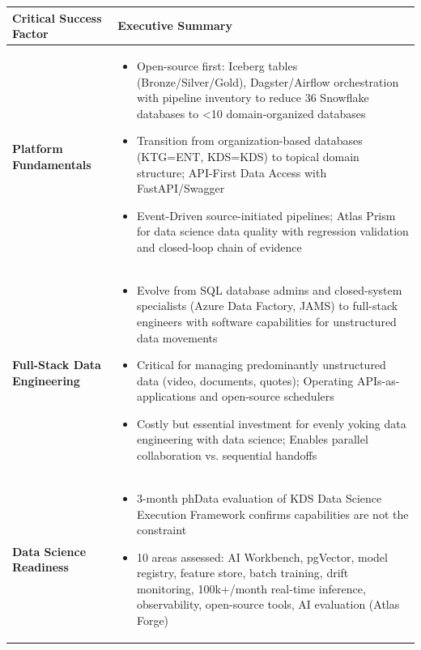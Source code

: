 \documentclass[12pt, a4paper]{article}
\begin{document}
{\small
\renewcommand{\arraystretch}{1.05}
\centering
\begin{tabularx}{\textwidth}{@{}
  >{\raggedright\arraybackslash}p{2.8cm}
  >{\raggedright\arraybackslash}p{\dimexpr\textwidth-2.8cm-2\tabcolsep-\arrayrulewidth\relax}@{}}
\toprule
\textbf{Critical Success Factor} & \textbf{Executive Summary} \\
\midrule
\textbf{Platform Fundamentals} &
\vspace{-0.5\baselineskip}
\begin{itemize}[leftmargin=*, nosep, topsep=0pt, partopsep=0pt]
  \item Open-source first: Iceberg tables (Bronze/Silver/Gold), Dagster/Airflow orchestration with pipeline inventory to reduce 36 Snowflake databases to <10 domain-organized databases
  \item Transition from organization-based databases (KTG=ENT, KDS=KDS) to topical domain structure; API-First Data Access with FastAPI/Swagger
  \item Event-Driven source-initiated pipelines; Atlas Prism for data science data quality with regression validation and closed-loop chain of evidence
\end{itemize} \\
\midrule
\textbf{Full-Stack Data Engineering} &
\vspace{-0.5\baselineskip}
\begin{itemize}[leftmargin=*, nosep, topsep=0pt, partopsep=0pt]
  \item Evolve from SQL database admins and closed-system specialists (Azure Data Factory, JAMS) to full-stack engineers with software capabilities for unstructured data movements
  \item Critical for managing predominantly unstructured data (video, documents, quotes); Operating APIs-as-applications and open-source schedulers
  \item Costly but essential investment for evenly yoking data engineering with data science; Enables parallel collaboration vs. sequential handoffs
\end{itemize} \\
\midrule
\textbf{Data Science Readiness} &
\vspace{-0.5\baselineskip}
\begin{itemize}[leftmargin=*, nosep, topsep=0pt, partopsep=0pt]
  \item 3-month phData evaluation of KDS Data Science Execution Framework confirms capabilities are not the constraint
  \item 10 areas assessed: AI Workbench, pgVector, model registry, feature store, batch training, drift monitoring, 100k+/month real-time inference, observability, open-source tools, AI evaluation (Atlas Forge)

\end{itemize}
\end{tabularx}}
\end{document}
